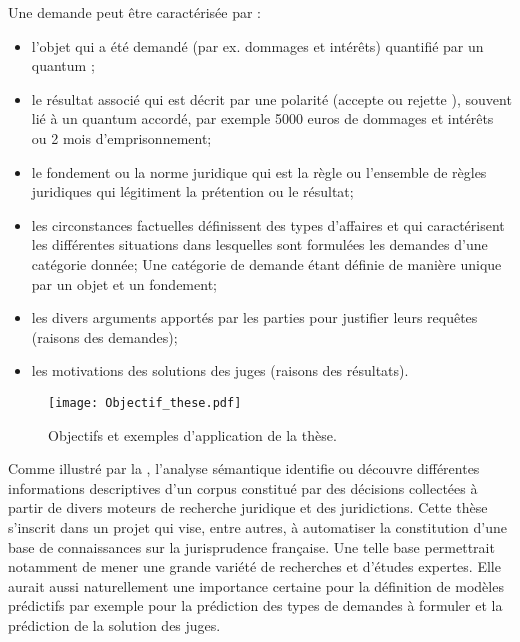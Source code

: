 Une demande peut être caractérisée par :
 \begin{itemize}
 	\item l'objet qui a été demandé (par ex. dommages et intérêts) quantifié par un quantum ;
	\item le résultat associé qui est décrit par une polarité (\og accepte \fg{} ou \og rejette \fg{}), souvent lié à un quantum accordé, par exemple 5000 euros de dommages et intérêts ou 2 mois d'emprisonnement;
	\item le fondement ou la norme juridique qui est la règle ou l'ensemble de règles juridiques qui légitiment la prétention ou le résultat;	
	\item les circonstances factuelles définissent des types d'affaires et qui caractérisent les différentes situations dans lesquelles sont formulées les demandes d'une catégorie donnée; Une catégorie de demande étant définie de manière unique par un objet et un fondement;
	\item les divers arguments apportés par les parties pour justifier leurs requêtes (raisons des demandes);
	\item les motivations des solutions des juges (raisons des résultats).
 \end{itemize}

\begin{figure}[!htb]
	\texttt{[image: Objectif\_these.pdf]}
	\caption{Objectifs et exemples d'application de la thèse.} \label{fig:intro:objectif-these}
\end{figure} 

Comme illustré par la  , l'analyse sémantique identifie ou découvre différentes informations descriptives d'un corpus constitué par des décisions collectées à partir de divers moteurs de recherche juridique et des juridictions. Cette thèse s'inscrit dans un projet qui vise, entre autres, à automatiser la constitution d'une base de connaissances sur la jurisprudence française. Une telle base permettrait notamment de mener une grande variété de recherches et d'études expertes. Elle aurait aussi naturellement une importance certaine pour la définition de modèles prédictifs par exemple pour la prédiction des types de demandes à formuler et la prédiction de la solution des juges. 

